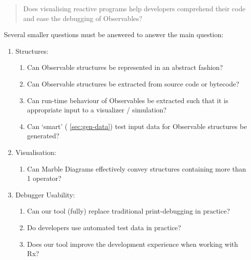 \begin{quotation}
    \noindent
    Does visualising reactive programs help developers comprehend their
    code and ease the debugging of Observables?
\end{quotation}

\noindent
Several smaller questions must be answered to answer the main question:

\begin{enumerate}
    \item
        Structures:
        \begin{enumerate}
            \item
                Can Observable structures be represented in an abstract
                fashion?
            \item
                Can Observable structures be extracted from source code
                or bytecode?
            \item
                Can run-time behaviour of Observables be extracted such
                that it is appropriate input to a visualizer /
                simulation?
            \item
                Can `smart' (%
                \ref{sec:gen-data}) test input data for Observable
                structures be generated?
        \end{enumerate}

    \item
        Visualisation:
        \begin{enumerate}
            \item
                \label{qstn:marble} Can Marble Diagrams effectively
                convey structures containing more than 1 operator?
        \end{enumerate}

    \item
        Debugger Usability:
        \begin{enumerate}
            \item
                \label{qstn:println} Can our tool (fully) replace
                traditional print-debugging in practice?
            \item
                \label{qstn:autogen} Do developers use automated test
                data in practice?
            \item
                \label{qstn:experience} Does our tool improve the
                development experience when working with Rx?
        \end{enumerate}

\end{enumerate}


